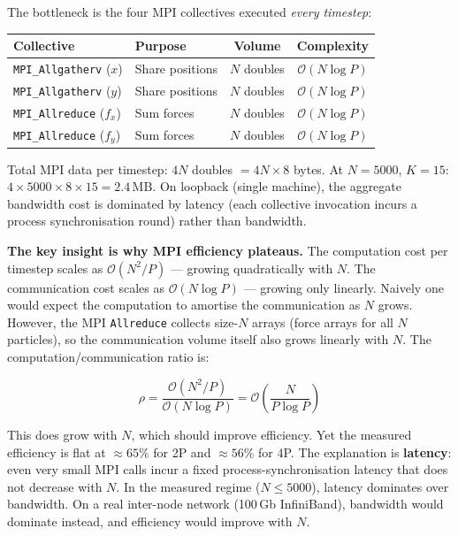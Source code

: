 ﻿\documentclass[12pt,a4paper]{article}
\begin{document}
The bottleneck is the four MPI collectives executed \emph{every timestep}:

\begin{center}
\begin{tabular}{llcc}
    \toprule
    \textbf{Collective} & \textbf{Purpose} & \textbf{Volume} & \textbf{Complexity} \\
    \midrule
    \texttt{MPI\_Allgatherv} ($x$)   & Share positions & $N$ doubles
        & $\mathcal{O}(N \log P)$ \\
    \texttt{MPI\_Allgatherv} ($y$)   & Share positions & $N$ doubles
        & $\mathcal{O}(N \log P)$ \\
    \texttt{MPI\_Allreduce} ($f_x$)  & Sum forces & $N$ doubles
        & $\mathcal{O}(N \log P)$ \\
    \texttt{MPI\_Allreduce} ($f_y$)  & Sum forces & $N$ doubles
        & $\mathcal{O}(N \log P)$ \\
    \bottomrule
\end{tabular}
\end{center}

Total MPI data per timestep: $4N$ doubles $= 4N \times 8$ bytes. At $N=5000$,
$K=15$: $4 \times 5000 \times 8 \times 15 = 2.4\,\text{MB}$. On loopback
(single machine), the aggregate bandwidth cost is dominated by latency (each
collective invocation incurs a process synchronisation round) rather than
bandwidth.

\textbf{The key insight is why MPI efficiency plateaus.}
The computation cost per timestep scales as $\mathcal{O}(N^2 / P)$ ---
growing quadratically with $N$. The communication cost scales as
$\mathcal{O}(N \log P)$ --- growing only linearly. Naively one would expect
the computation to amortise the communication as $N$ grows. However, the
MPI \texttt{Allreduce} collects size-$N$ arrays (force arrays for all $N$
particles), so the communication volume itself also grows linearly with $N$.
The computation/communication ratio is:

\begin{equation}
    \rho = \frac{\mathcal{O}(N^2/P)}{\mathcal{O}(N \log P)}
         = \mathcal{O}\!\left(\frac{N}{P \log P}\right)
\end{equation}

This does grow with $N$, which should improve efficiency. Yet the measured
efficiency is flat at $\approx 65\%$ for 2P and $\approx 56\%$ for 4P.
The explanation is \textbf{latency}: even very small MPI calls incur a
fixed process-synchronisation latency that does not decrease with $N$.
In the measured regime ($N \leq 5000$), latency dominates over bandwidth.
On a real inter-node network (100\,Gb InfiniBand), bandwidth would dominate
instead, and efficiency would improve with $N$.
\end{document}
